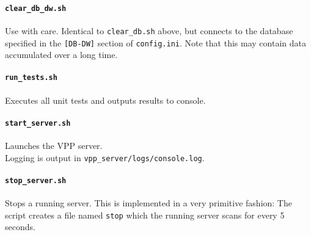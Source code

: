 \paragraph{\texttt{clear\_db\_dw.sh}}
Use with care. Identical to \texttt{clear\_db.sh} above, but connects to the database specified in the \texttt{[DB-DW]} section of \texttt{config.ini}. Note that this may contain data accumulated over a long time.


\paragraph{\texttt{run\_tests.sh}}
Executes all unit tests and outputs results to console.

\paragraph{\texttt{start\_server.sh}}
Launches the VPP server. \\
Logging is output in \texttt{vpp\_server/logs/console.log}.


\paragraph{\texttt{stop\_server.sh}}
Stops a running server. 
This is implemented in a very primitive fashion: The script creates a file named \texttt{stop} which the running server scans for every 5 seconds. 